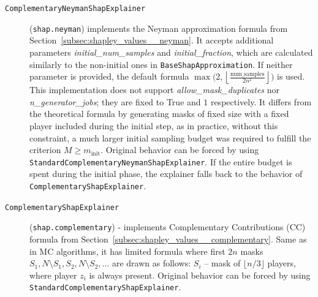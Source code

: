 \begin{appendices}
\begin{description}
    \item[\texttt{ComplementaryNeymanShapExplainer}] (\texttt{shap.neyman}) implements the Neyman approximation formula from Section~\ref{subsec:shapley_values__neyman}. It accepts additional parameters \textit{initial\_num\_samples} and \textit{initial\_fraction}, which are calculated similarly to the non-initial ones in \texttt{BaseShapApproximation}. If neither parameter is provided, the default formula $\max\big(2, \left\lfloor \frac{\text{num\_samples}}{2 n^2} \right\rfloor \big)$ is used. This implementation does not support \textit{allow\_mask\_duplicates} nor \textit{n\_generator\_jobs}; they are fixed to True and $1$ respectively. It differs from the theoretical formula by generating masks of fixed size with a fixed player included during the initial step, as in practice, without this constraint, a much larger initial sampling budget was required to fulfill the criterion $M \ge m_{\text{init}}$. Original behavior can be forced by using \texttt{StandardComplementaryNeymanShapExplainer}. If the entire budget is spent during the initial phase, the explainer falls back to the behavior of \texttt{ComplementaryShapExplainer}.

    \item[\texttt{ComplementaryShapExplainer}] (\texttt{shap.complementary}) - implements Complementary Contributions (CC) formula from Section~\ref{subsec:shapley_values__complementary}. Same as in MC algorithms, it has limited formula where first $2n$ masks $S_1, N \setminus S_1, S_2, N \setminus S_2, \dots$ are drawn as follows: $S_i$ -- mask of $\lfloor n / 3 \rfloor$ players, where player $z_i$ is always present. Original behavior can be forced by using \texttt{StandardComplementaryShapExplainer}.


\end{description}
\end{appendices}
